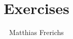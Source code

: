 \documentclass[
oneside
]{scrreprt}
\makeatletter
\newcommand{\DOCNAME}{Exercises}
\renewcommand\maketitle
  {\noindent
   {\huge\bfseries\@title}%
   \medskip\par\noindent
   {\large\bfseries\@author}%
   \hfill
   {\large\@date}%
   \bigskip\par\noindent
  }
\makeatother
\begin{document}
\title{\DOCNAME}
\author{Matthias Frerichs}
\maketitle

\tableofcontents




\printbibliography
\end{document}
